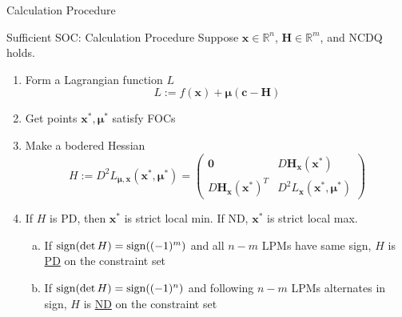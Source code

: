 \documentclass[final]{beamer}
\newcommand{\bb}{\mathbb}
\newcommand{\bd}{\mathbf}
\begin{document}
\begin{frame}[t]{Calculation Procedure}
	\begin{block}
		{Sufficient SOC: Calculation Procedure}
		Suppose $\bd{x}\in{\bb{R}^n}$, $\bd{H}\in\bb{R}^m$, and NCDQ holds.
		\begin{enumerate}
			\item Form a Lagrangian function $L$\[
				L:= f(\bd{x}) + \bd{\mu}(\bd{c}-\bd{H})
			\]
			\item Get points $\bd{x^\ast,\mu^\ast}$ satisfy FOCs
			\item Make a bodered Hessian\[
				H:=D^2L_{\bd{\mu,x}}(\bd{x^\ast,\mu^\ast})
				=\begin{pmatrix}
					\bd{0}&D\bd{H}_{\bd{x}}(\bd{x^\ast})\\
					D\bd{H}_{\bd{x}}(\bd{x^\ast})^T& D^2L_{\bd{x}}(\bd{x^\ast,\mu^\ast})
				\end{pmatrix}
			\]
			\item If $H$ is PD, then $\bd{x^\ast}$ is strict local min. If ND, $\bd{x^\ast}$ is strict local max.
			\begin{enumerate}[(a)]
				\item If ${\rm sign}(\det H)={\rm sign}((-1)^m)$ and all $n-m$ LPMs have same sign, $H$ is \uline{PD} on the constraint set
				\item If ${\rm sign}(\det H)={\rm sign}((-1)^n)$ and following $n-m$ LPMs alternates in sign, $H$ is \uline{ND} on the constraint set 
			\end{enumerate}
		\end{enumerate}
	\end{block}
\end{frame}
\end{document}
